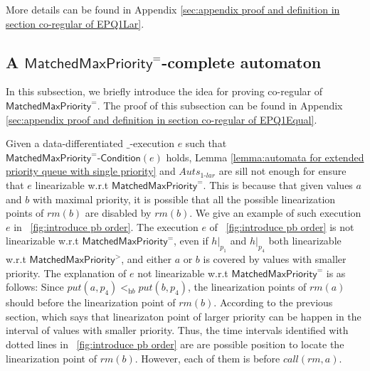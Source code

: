 More details can be found in Appendix \ref{sec:appendix proof and definition in section co-regular of EPQ1Lar}. %


\subsection{A $\mathsf{MatchedMaxPriority}^=$-complete automaton}
\label{subsec:co-regular of EPQ1Equal}

In this subsection, we briefly introduce the idea for proving co-regular of $\mathsf{MatchedMaxPriority}^{=}$. The proof of this subsection can be found in Appendix \ref{sec:appendix proof and definition in section co-regular of EPQ1Equal}.

Given a data-differentiated $\_$-execution $e$ such that $\mathsf{MatchedMaxPriority}^{=}\mathsf{\text{-}Condition}(e)$ holds, Lemma \ref{lemma:automata for extended priority queue with single priority} and $\textit{Auts}_{\textit{1-lar}}$ are sill not enough for ensure that $e$ linearizable w.r.t $\mathsf{MatchedMaxPriority}^{=}$. This is because that given values $a$ and $b$ with maximal priority, it is possible that all the possible linearization points of $\textit{rm}(b)$ are disabled by $\textit{rm}(b)$. We give an example of such execution $e$ in \figurename~\ref{fig:introduce pb order}. The execution $e$ of \figurename~\ref{fig:introduce pb order} is not linearizable w.r.t $\mathsf{MatchedMaxPriority}^{=}$, even if $h \vert_{p_1}$ and $h \vert_{p_4}$ both linearizable w.r.t $\mathsf{MatchedMaxPriority}^{>}$, and either $a$ or $b$ is covered by values with smaller priority. The explanation of $e$ not linearizable w.r.t $\mathsf{MatchedMaxPriority}^{=}$ is as follows: Since $\textit{put}(a,p_4) <_{\textit{hb}} \textit{put}(b,p_4)$, the linearization points of $\textit{rm}(a)$ should before the linearization point of $\textit{rm}(b)$. According to the previous section, which says that linearizaton point of larger priority can be happen in the interval of values with smaller priority. Thus, the time intervals identified with dotted lines in \figurename~\ref{fig:introduce pb order} are are possible position to locate the linearization point of $\textit{rm}(b)$. However, each of them is before $\textit{call}(\textit{rm},a)$.

